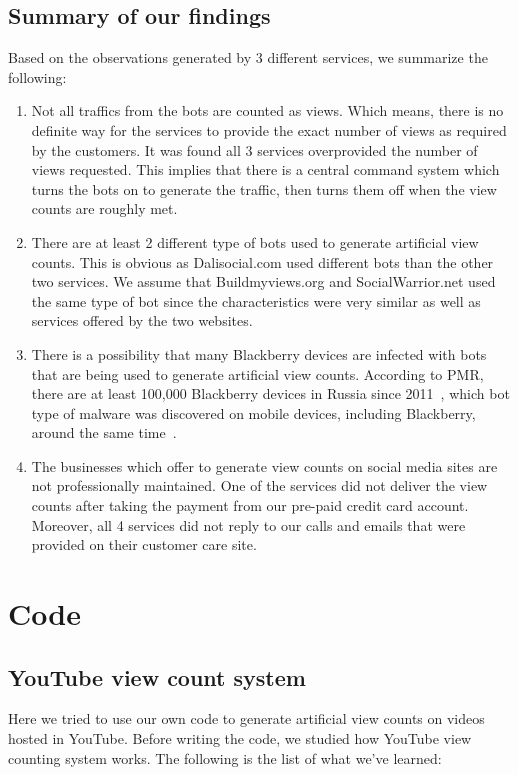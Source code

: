 \documentclass[conference]{IEEEtran}
\begin{document}
\subsection{Summary of our findings}

Based on the observations generated by 3 different services, we summarize the following:

\begin{enumerate}
  \item Not all traffics from the bots are counted as views. Which means, there is no definite way for the services to provide the exact number of views as required by the customers. It was found all 3 services overprovided the number of views requested. This implies that there is a central command system which turns the bots on to generate the traffic, then turns them off when the view counts are roughly met.
  \item There are at least 2 different type of bots used to generate artificial view counts. This is obvious as Dalisocial.com used different bots than the other two services. We assume that Buildmyviews.org and SocialWarrior.net used the same type of bot since the characteristics were very similar as well as services offered by the two websites.
  \item There is a possibility that many Blackberry devices are infected with bots that are being used to generate artificial view counts. According to PMR, there are at least 100,000 Blackberry devices in Russia since 2011~\cite{c13}, which bot type of malware was discovered on mobile devices, including Blackberry, around the same time~\cite{c12}.
  \item The businesses which offer to generate view counts on social media sites are not professionally maintained. One of the services did not deliver the view counts after taking the payment from our pre-paid credit card account. Moreover, all 4 services did not reply to our calls and emails that were provided on their customer care site.
\end{enumerate}

\section{Code}

\subsection{YouTube view count system}

Here we tried to use our own code to generate artificial view counts on videos hosted in YouTube. Before writing the code, we studied how YouTube view counting system works. The following is the list of what we’ve learned:
\end{document}
